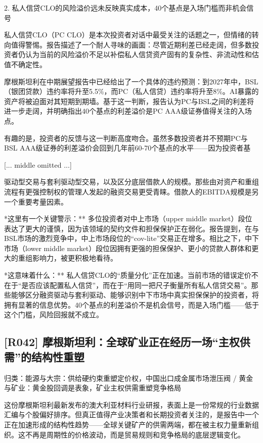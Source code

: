 \documentclass[11pt]{ctexart}
\begin{document}
2. 私人信贷CLO的风险溢价远未反映真实成本，40个基点是入场门槛而非机会信号

私人信贷CLO（PC CLO）是本次投资者对话中最受关注的话题之一，但情绪的转向值得警惕。报告描述了一个耐人寻味的画面：尽管近期利差已经走阔，但多数投资者仍认为当前的风险溢价不足以补偿私人信贷资产固有的复杂性、非流动性和估值不确定性。

摩根斯坦利在中期展望报告中已经给出了一个具体的违约预测：到2027年中，BSL（银团贷款）违约率将升至5.5\%，而PC（私人信贷）违约率将升至8\%。AI暴露的资产将被迫面对其短期到期墙。基于这一判断，报告认为PC与BSL之间的利差将进一步走阔，并明确指出40个基点的利差溢价是PC AAA级证券值得关注的入场点。

有趣的是，投资者的反馈与这一判断高度吻合。虽然多数投资者并不预期PC与BSL AAA级证券的利差溢价会回到几年前60-70个基点的水平——因为投资者基

[... middle omitted ...]

驱动型交易与套利驱动型交易，以及区分底层借款人的规模。那些由对资产和重组流程有更强控制权的管理人发起的融资交易更受青睐。借款人的EBITDA规模是另一个重要考量因素。

*这里有一个关键警示：** 多位投资者对中上市场（upper middle market）段位表达了更大的谨慎，因为该领域的契约文件和担保保护正在弱化。报告提到，在与BSL市场的激烈竞争中，中上市场段位的“cov-lite”交易正在增多。相比之下，中下市场（lower middle market）段位因拥有更强的担保保护、更小的贷款人群体和更大的重组影响力，被更积极地看待。

*这意味着什么：** 私人信贷CLO的“质量分化”正在加速。当前市场的错误定价不在于“是否应该配置私人信贷”，而在于“用同一把尺子衡量所有私人信贷交易”。那些能够区分融资驱动与套利驱动、能够识别中下市场中真实担保保护的投资者，将拥有显著的信息优势。40个基点的利差溢价不是机会信号，而是入场门槛——低于这个门槛，风险回报就不成立。

\subsection{[R042] 摩根斯坦利：全球矿业正在经历一场“主权供需”的结构性重塑}
{\small\color{refgray}归类：能源与大宗：供给硬约束重塑定价权，中国出口成金属市场泄压阀 / 黄金与矿业：黄金股回调是表象，矿业主权供需重塑竞争格局}

这份摩根斯坦利最新发布的澳大利亚材料行业研报，表面上是一份常规的行业数据汇编与个股偏好排序。但真正值得产业决策者和长期投资者关注的，是报告中一个正在加速形成的结构性趋势——全球关键矿产的供需两端，都在被主权力量重新组织。这不再是周期性的价格波动，而是贸易规则和竞争格局的底层逻辑变化。
\end{document}
